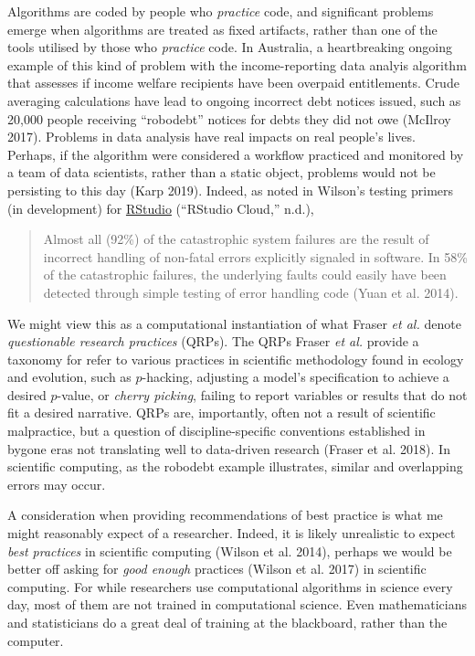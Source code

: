 \documentclass[
]{article}
\begin{document}
Algorithms are coded by people who \emph{practice} code, and significant
problems emerge when algorithms are treated as fixed artifacts, rather
than one of the tools utilised by those who \emph{practice} code. In
Australia, a heartbreaking ongoing example of this kind of problem with
the income-reporting data analyis algorithm that assesses if income
welfare recipients have been overpaid entitlements. Crude averaging
calculations have lead to ongoing incorrect debt notices issued, such as
20,000 people receiving ``robodebt'' notices for debts they did not owe
(McIlroy 2017). Problems in data analysis have real impacts on real
people's lives. Perhaps, if the algorithm were considered a workflow
practiced and monitored by a team of data scientists, rather than a
static object, problems would not be persisting to this day (Karp 2019).
Indeed, as noted in Wilson's testing primers (in development) for
\href{https://rstudio.cloud/learn/primers}{RStudio} (``RStudio Cloud,''
n.d.),

\begin{quote}
Almost all (92\%) of the catastrophic system failures are the result of
incorrect handling of non-fatal errors explicitly signaled in software.
In 58\% of the catastrophic failures, the underlying faults could easily
have been detected through simple testing of error handling code (Yuan
et al. 2014).
\end{quote}

We might view this as a computational instantiation of what Fraser
\emph{et al.} denote \emph{questionable research practices} (QRPs). The
QRPs Fraser \emph{et al.} provide a taxonomy for refer to various
practices in scientific methodology found in ecology and evolution, such
as \(p\)-hacking, adjusting a model's specification to achieve a desired
\(p\)-value, or \emph{cherry picking}, failing to report variables or
results that do not fit a desired narrative. QRPs are, importantly,
often not a result of scientific malpractice, but a question of
discipline-specific conventions established in bygone eras not
translating well to data-driven research (Fraser et al. 2018). In
scientific computing, as the robodebt example illustrates, similar and
overlapping errors may occur.

A consideration when providing recommendations of best practice is what
me might reasonably expect of a researcher. Indeed, it is likely
unrealistic to expect \emph{best practices} in scientific computing
(Wilson et al. 2014), perhaps we would be better off asking for
\emph{good enough} practices (Wilson et al. 2017) in scientific
computing. For while researchers use computational algorithms in science
every day, most of them are not trained in computational science. Even
mathematicians and statisticians do a great deal of training at the
blackboard, rather than the computer.
\end{document}
